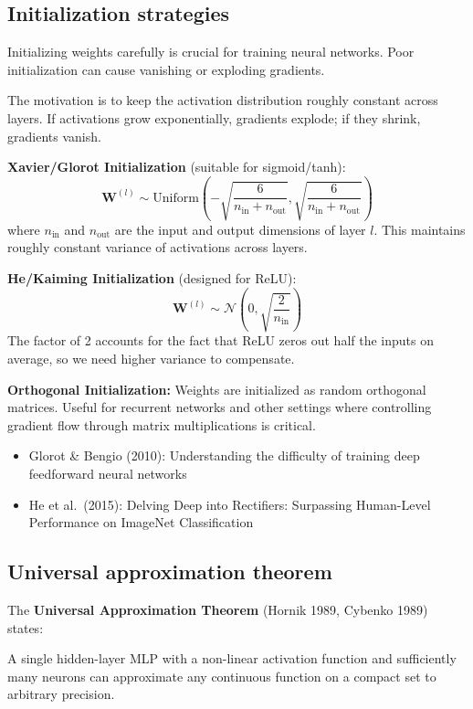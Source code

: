 \subsection{Initialization strategies}

Initializing weights carefully is crucial for training neural networks. Poor initialization can cause vanishing or exploding gradients.

\begin{intuitionbox}
The motivation is to keep the activation distribution roughly constant across layers. If activations grow exponentially, gradients explode; if they shrink, gradients vanish.
\end{intuitionbox}

\textbf{Xavier/Glorot Initialization} (suitable for sigmoid/tanh):
\[
\mathbf{W}^{(l)} \sim \text{Uniform}\left(-\sqrt{\frac{6}{n_{\text{in}} + n_{\text{out}}}}, \sqrt{\frac{6}{n_{\text{in}} + n_{\text{out}}}}\right)
\]
where $n_{\text{in}}$ and $n_{\text{out}}$ are the input and output dimensions of layer $l$. This maintains roughly constant variance of activations across layers.

\textbf{He/Kaiming Initialization} (designed for ReLU):
\[
\mathbf{W}^{(l)} \sim \mathcal{N}\left(0, \sqrt{\frac{2}{n_{\text{in}}}}\right)
\]
The factor of 2 accounts for the fact that ReLU zeros out half the inputs on average, so we need higher variance to compensate.

\textbf{Orthogonal Initialization:} Weights are initialized as random orthogonal matrices. Useful for recurrent networks and other settings where controlling gradient flow through matrix multiplications is critical.

\begin{paperbox}[title={References: Initialization}]
\begin{itemize}
  \item Glorot \& Bengio (2010): Understanding the difficulty of training deep feedforward neural networks
  \item He et al.~(2015): Delving Deep into Rectifiers: Surpassing Human-Level Performance on ImageNet Classification
\end{itemize}
\end{paperbox}


\subsection{Universal approximation theorem}

The \textbf{Universal Approximation Theorem} (Hornik 1989, Cybenko 1989) states:
\begin{notebox}
A single hidden-layer MLP with a non-linear activation function and sufficiently many neurons can approximate any continuous function on a compact set to arbitrary precision.
\end{notebox}

